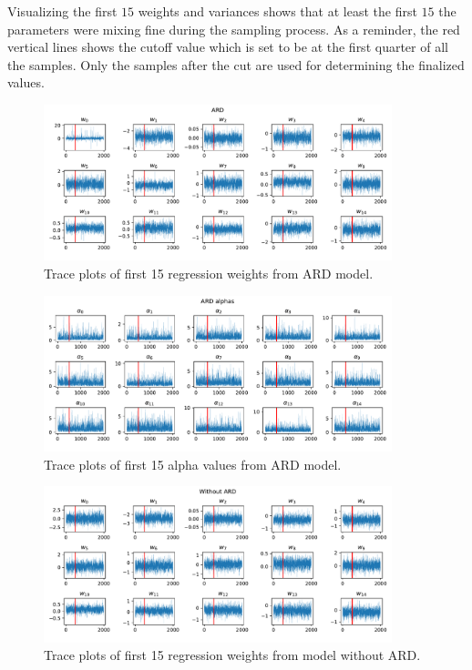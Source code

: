 \documentclass[12pt]{article}
\begin{document}
    Visualizing the first $15$ weights and variances shows that at least the first  $15$ the parameters were mixing fine during the sampling process. As a reminder, the red vertical lines shows the cutoff value which is set to be at the first quarter of all the samples. Only the samples after the cut are used for determining the finalized values. 
    \begin{figure}[H]
        \centering
        \includegraphics[width=0.9\textwidth]{real_w_traces_ard}
        \caption{Trace plots of first 15 regression weights from ARD model.}
    \end{figure}
    \begin{figure}[H]
        \centering
        \includegraphics[width=0.9\textwidth]{real_alpha_traces_ard}
        \caption{Trace plots of first 15 alpha values from ARD model.}
    \end{figure}
    \begin{figure}[H]
        \centering
        \includegraphics[width=0.9\textwidth]{real_w_traces_regular}
        \caption{Trace plots of first 15 regression weights from model without ARD.}
    \end{figure}
\end{document}
